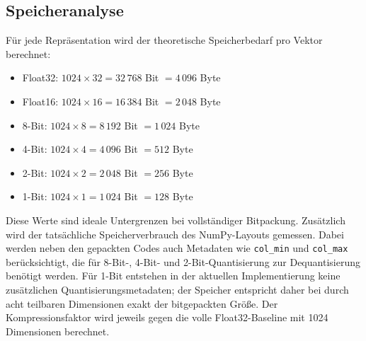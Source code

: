 \subsection{Speicheranalyse}
%
Für jede Repräsentation wird der theoretische Speicherbedarf pro Vektor berechnet:
\begin{itemize}
  \item Float32: $1024 \times 32 = 32\,768$ Bit $= 4\,096$ Byte
  \item Float16: $1024 \times 16 = 16\,384$ Bit $= 2\,048$ Byte
  \item 8-Bit: $1024 \times 8 = 8\,192$ Bit $= 1\,024$ Byte
  \item 4-Bit: $1024 \times 4 = 4\,096$ Bit $= 512$ Byte
  \item 2-Bit: $1024 \times 2 = 2\,048$ Bit $= 256$ Byte
  \item 1-Bit: $1024 \times 1 = 1\,024$ Bit $= 128$ Byte
\end{itemize}
%
Diese Werte sind ideale Untergrenzen bei vollständiger Bitpackung.
Zusätzlich wird der tatsächliche Speicherverbrauch des NumPy-Layouts gemessen.
Dabei werden neben den gepackten Codes auch Metadaten wie \texttt{col\_min} und \texttt{col\_max} berücksichtigt, die für 8-Bit-, 4-Bit- und 2-Bit-Quantisierung zur Dequantisierung benötigt werden.
Für 1-Bit entstehen in der aktuellen Implementierung keine zusätzlichen Quantisierungsmetadaten; der Speicher entspricht daher bei durch acht teilbaren Dimensionen exakt der bitgepackten Größe.
Der Kompressionsfaktor wird jeweils gegen die volle Float32-Baseline mit 1024 Dimensionen berechnet.
%
